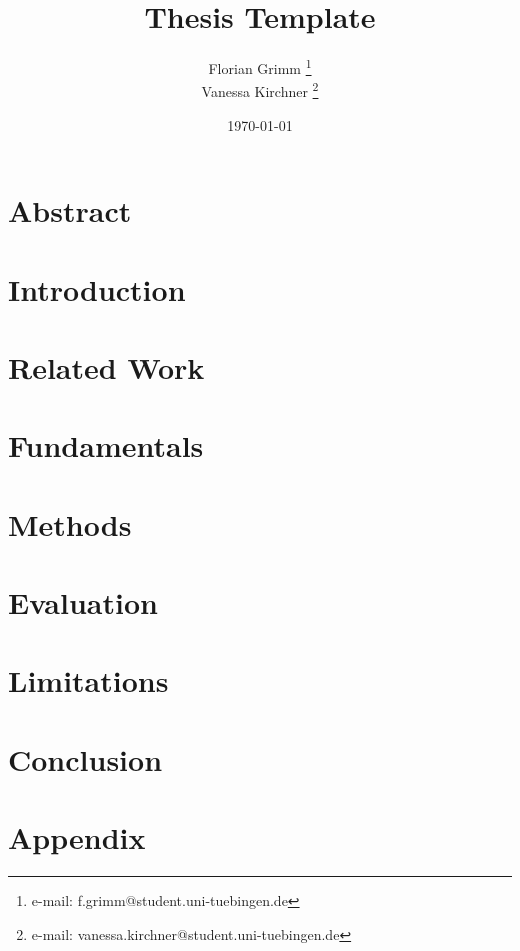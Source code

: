 \documentclass[a4paper,cleardoubleempty,BCOR1cm]{scrbook}
\title{Thesis Template}
\author{Florian Grimm \thanks{e-mail: f.grimm@student.uni-tuebingen.de}\\Vanessa Kirchner \thanks{e-mail: vanessa.kirchner@student.uni-tuebingen.de} }
\date{\today}
\begin{document}


\chapter*{Abstract}



\tableofcontents


\chapter{Introduction}


\chapter{Related Work}
\label{ch:relWork}


\chapter{Fundamentals}
\label{ch:fundamentals}


\chapter{Methods}
\label{ch:methods}



\chapter{Evaluation}
\label{ch:eval}



\chapter{Limitations}
\label{ch:limitations}

\chapter{Conclusion}



\appendix
\chapter{Appendix}




% 
%
%
%

\end{document}
